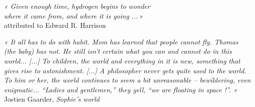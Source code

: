 
\newpage
\thispagestyle{empty}
\null
\newpage

\thispagestyle{empty}

\vspace*{9.5cm}
\hspace*{0.44\textwidth}
\begin{minipage}{0.55\textwidth}
\emph{« Given enough time, hydrogen begins to wonder\\
where it came from, and where it is going ...\,»}\\
\hspace*{2cm}attributed to Edward R. Harrison
\end{minipage}




\loremipsum


\loremipsum

\newpage
\null
\newpage
\dominitoc
\renewcommand{\leftmark}{Contents}
\tableofcontents


\newpage

\setcounter{page}{1}



\begin{center}
\begin{minipage}{0.95\textwidth}
\emph{« It all has to do with habit. Mom has learned that people cannot fly. Thomas (the baby) has
not. He still isn’t certain what you can and cannot do in this world...  [...] To children, the
world and everything in it is new, something that gives rise to astonishment. [...]
A philosopher never gets quite used to the world. To him or her, the world continues to seem
a bit unreasonable – bewildering, even enigmatic... “Ladies and gentlemen,” they yell,
“we are floating in space !”. »}\\
\hspace*{0.6\textwidth} Jostien Gaarder, \emph{Sophie's world}
\end{minipage}
\end{center}

